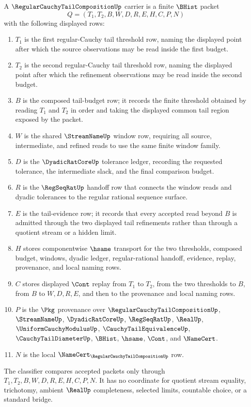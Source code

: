 \begin{definition}
\label{def:regular-cauchy-tail-composition-carrier}
A $\RegularCauchyTailCompositionUp$ carrier is a finite $\BHist$ packet
$$
Q=(T_1,T_2,B,W,D,R,E,H,C,P,N)
$$
with the following displayed rows:
\begin{enumerate}
\item $T_1$ is the first regular-Cauchy tail threshold row, naming the displayed point after which the source observations may be read inside the first budget.
\item $T_2$ is the second regular-Cauchy tail threshold row, naming the displayed point after which the refinement observations may be read inside the second budget.
\item $B$ is the composed tail-budget row; it records the finite threshold obtained by reading $T_1$ and $T_2$ in order and taking the displayed common tail region exposed by the packet.
\item $W$ is the shared $\StreamNameUp$ window row, requiring all source, intermediate, and refined reads to use the same finite window family.
\item $D$ is the $\DyadicRatCoreUp$ tolerance ledger, recording the requested tolerance, the intermediate slack, and the final comparison budget.
\item $R$ is the $\RegSeqRatUp$ handoff row that connects the window reads and dyadic tolerances to the regular rational sequence surface.
\item $E$ is the tail-evidence row; it records that every accepted read beyond $B$ is admitted through the two displayed tail refinements rather than through a quotient stream or a hidden limit.
\item $H$ stores componentwise $\hsame$ transport for the two thresholds, composed budget, windows, dyadic ledger, regular-rational handoff, evidence, replay, provenance, and local naming rows.
\item $C$ stores displayed $\Cont$ replay from $T_1$ to $T_2$, from the two thresholds to $B$, from $B$ to $W,D,R,E$, and then to the provenance and local naming rows.
\item $P$ is the $\Pkg$ provenance over $\RegularCauchyTailCompositionUp$, $\StreamNameUp$, $\DyadicRatCoreUp$, $\RegSeqRatUp$, $\RealUp$, $\UniformCauchyModulusUp$, $\CauchyTailEquivalenceUp$, $\CauchyTailDiameterUp$, $\BHist$, $\hsame$, $\Cont$, and $\NameCert$.
\item $N$ is the local $\NameCert_{\RegularCauchyTailCompositionUp}$ row.
\end{enumerate}
The classifier compares accepted packets only through $T_1,T_2,B,W,D,R,E,H,C,P,N$. It has no coordinate for quotient stream equality, trichotomy, ambient $\RealUp$ completeness, selected limits, countable choice, or a standard bridge.
\end{definition}

